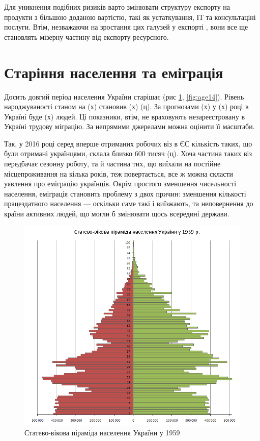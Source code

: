         Для уникнення подібних ризиків варто змінювати структуру експорту на продукти з більшою доданою вартістю,
        такі як устаткування, ІТ та консультаціні послуги. Втім, незважаючи на зростання цих галузей у експорті \cite{export2016},
        вони все ще становлять мізерну частину від експорту ресурсного.


        \section{Старіння населення та еміграція}
            Досить довгий період населення України старішає (рис \ref{fig:age59}, \ref{fig:age14}). Рівень народжуваності станом на (х) становив (х) (ц). 
            За прогнозами (х) у (х) році в Україні буде (х) людей. Ці показники, втім, не враховують незареєстровану в 
            Україні трудову міграцію. За непрямими джерелами можна оцінити її масштаби.
            
            Так, у 2016 році серед вперше отриманих робочих віз в ЄС кількість таких, що були отримані українцями, склала близко 600 тисяч (ц). Хоча частина таких
            віз передбачає сезонну роботу, та й частина тих, що виїхали на постійне місцепроживання на кілька років, теж
            повертається, все ж можна скласти уявлення про еміграцію українців. Окрім простого зменшення чисельності населення,
            еміграція становить проблему з двох причин: зменшення кількості працездатного населення --- оскільки саме такі і
            виїзжають, та неповернення до країни активних людей, що могли б змінювати щось всередині держави.

            \begin{figure}[!htp]
                \centering
                \includegraphics[scale = 0.4]{PNG/PopulationPyramideUkraine1959.PNG}
                \caption{Статево-вікова піраміда населення України у 1959}
                \label{fig:age59}
            \end{figure}

